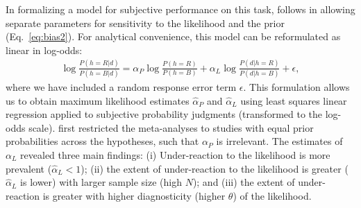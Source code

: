 In formalizing a model for subjective performance on this task, \cite{benjamin18} follows \cite{grether1980bayes} in allowing separate parameters for sensitivity to the likelihood and the prior (Eq.~\ref{eq:bias2}). For analytical convenience, this model can be reformulated as linear in log-odds:
\begin{align}
    \log\frac{P(h = R| d)}{P(h=B| d)} = 
    \alpha_P \log \frac{P(h=R)}{P(h=B)}  +
    \alpha_L\log \frac{P(d | h=R)}{P(d |h=B)} + \epsilon,
    \label{eq:sysneg}
\end{align}
where we have included a random response error term $\epsilon$. This formulation allows us to obtain maximum likelihood estimates $\hat{\alpha}_P$ and $\hat{\alpha}_L$ using least squares linear regression applied to subjective probability judgments (transformed to the log-odds scale). \cite{benjamin18} first restricted the meta-analyses to studies with equal prior probabilities across the hypotheses, such that $\alpha_P$ is irrelevant. The estimates of $\alpha_L$ revealed three main findings: (i) Under-reaction to the likelihood is more prevalent ($\hat{\alpha}_L<1$); (ii) the extent of under-reaction to the likelihood is greater ($\hat{\alpha}_L$ is lower) with larger sample size (high $N$); and (iii) the extent of under-reaction is greater with higher diagnosticity (higher $\theta$) of the likelihood.

